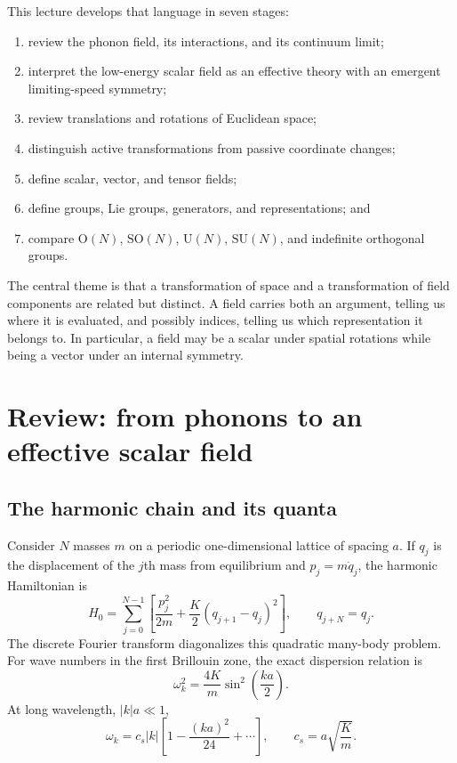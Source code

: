 \documentclass[11pt]{article}
\newcommand{\SO}{\mathrm{SO}}
\newcommand{\OO}{\mathrm{O}}
\newcommand{\UU}{\mathrm{U}}
\newcommand{\SU}{\mathrm{SU}}
\begin{document}
This lecture develops that language in seven stages:
\begin{enumerate}
  \item review the phonon field, its interactions, and its continuum limit;
  \item interpret the low-energy scalar field as an effective theory with an
  emergent limiting-speed symmetry;
  \item review translations and rotations of Euclidean space;
  \item distinguish active transformations from passive coordinate changes;
  \item define scalar, vector, and tensor fields;
  \item define groups, Lie groups, generators, and representations; and
  \item compare $\OO(N)$, $\SO(N)$, $\UU(N)$, $\SU(N)$, and indefinite
  orthogonal groups.
\end{enumerate}

The central theme is that a transformation of space and a transformation of
field components are related but distinct.  A field carries both an argument,
telling us where it is evaluated, and possibly indices, telling us which
representation it belongs to.  In particular, a field may be a scalar under
spatial rotations while being a vector under an internal symmetry.

\section{Review: from phonons to an effective scalar field}

\subsection{The harmonic chain and its quanta}

Consider $N$ masses $m$ on a periodic one-dimensional lattice of spacing
$a$.  If $q_j$ is the displacement of the $j$th mass from equilibrium and
$p_j=m\dot q_j$, the harmonic Hamiltonian is
\begin{equation}
  H_0=\sum_{j=0}^{N-1}\left[
    \frac{p_j^2}{2m}+\frac K2(q_{j+1}-q_j)^2
  \right],
  \qquad q_{j+N}=q_j.
  \label{eq:harmonicchain}
\end{equation}
The discrete Fourier transform diagonalizes this quadratic many-body problem.
For wave numbers in the first Brillouin zone, the exact dispersion relation is
\begin{equation}
  \omega_k^2=\frac{4K}{m}\sin^2\!\left(\frac{ka}{2}\right).
  \label{eq:latticedispersion}
\end{equation}
At long wavelength, $|k|a\ll1$,
\begin{equation}
  \omega_k=c_s|k|\left[1-\frac{(ka)^2}{24}+\cdots\right],
  \qquad
  c_s=a\sqrt{\frac Km}.
  \label{eq:longdispersion}
\end{equation}
\end{document}

